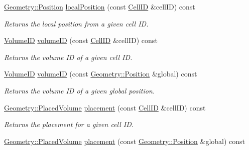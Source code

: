 \begin{DoxyCompactItemize}
\hyperlink{namespace_d_d4hep_1_1_geometry_a55083902099d03506c6db01b80404900}{Geometry::Position} \hyperlink{class_d_d4hep_1_1_d_d_rec_1_1_i_d_decoder_a60e6cafbb3f3e57f6d041b2d17f1c92e}{localPosition} (const \hyperlink{namespace_d_d4hep_1_1_d_d_rec_af5cecc2e566eeaedb430b92df23971d4}{CellID} \&cellID) const 
\begin{DoxyCompactList}\small\item\em Returns the local position from a given cell ID. \item\end{DoxyCompactList}\item 
\hyperlink{namespace_d_d4hep_1_1_d_d_rec_a5b5fea15b3678944e1aba487a746bdcb}{VolumeID} \hyperlink{class_d_d4hep_1_1_d_d_rec_1_1_i_d_decoder_a0fa5014a696350c74feb78fff02c34c0}{volumeID} (const \hyperlink{namespace_d_d4hep_1_1_d_d_rec_af5cecc2e566eeaedb430b92df23971d4}{CellID} \&cellID) const 
\begin{DoxyCompactList}\small\item\em Returns the volume ID of a given cell ID. \item\end{DoxyCompactList}\item 
\hyperlink{namespace_d_d4hep_1_1_d_d_rec_a5b5fea15b3678944e1aba487a746bdcb}{VolumeID} \hyperlink{class_d_d4hep_1_1_d_d_rec_1_1_i_d_decoder_a44f55112f9d660bf5db4c5de716ecf19}{volumeID} (const \hyperlink{namespace_d_d4hep_1_1_geometry_a55083902099d03506c6db01b80404900}{Geometry::Position} \&global) const 
\begin{DoxyCompactList}\small\item\em Returns the volume ID of a given global position. \item\end{DoxyCompactList}\item 
\hyperlink{class_d_d4hep_1_1_geometry_1_1_placed_volume}{Geometry::PlacedVolume} \hyperlink{class_d_d4hep_1_1_d_d_rec_1_1_i_d_decoder_ad17a0d1008a71a45859947c544feab80}{placement} (const \hyperlink{namespace_d_d4hep_1_1_d_d_rec_af5cecc2e566eeaedb430b92df23971d4}{CellID} \&cellID) const 
\begin{DoxyCompactList}\small\item\em Returns the placement for a given cell ID. \item\end{DoxyCompactList}\item 
\hyperlink{class_d_d4hep_1_1_geometry_1_1_placed_volume}{Geometry::PlacedVolume} \hyperlink{class_d_d4hep_1_1_d_d_rec_1_1_i_d_decoder_a818a4762684755b9bab753a3b5118b25}{placement} (const \hyperlink{namespace_d_d4hep_1_1_geometry_a55083902099d03506c6db01b80404900}{Geometry::Position} \&global) const 

\end{DoxyCompactItemize}
